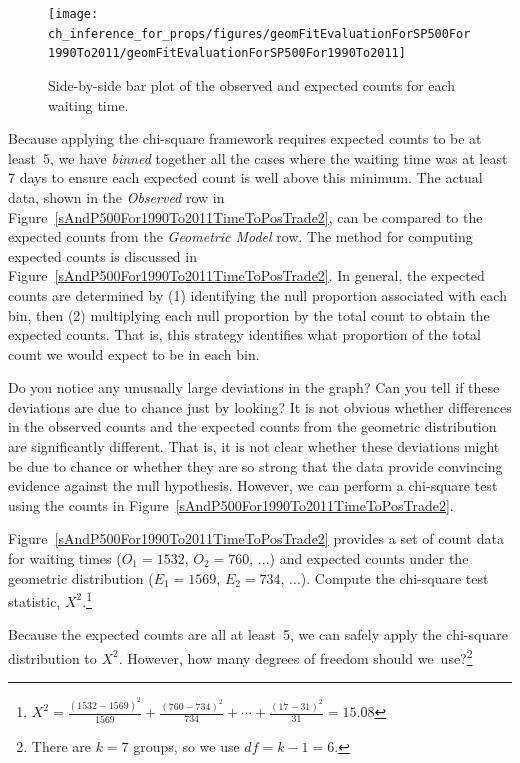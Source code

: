\begin{figure}
\centering
\texttt{[image: ch\_inference\_for\_props/figures/geomFitEvaluationForSP500For1990To2011/geomFitEvaluationForSP500For1990To2011]}
\caption{Side-by-side bar plot of the observed and expected counts for each waiting time.}
\label{geomFitEvaluationForSP500For1990To2011}
\end{figure}

Because applying the chi-square framework requires expected counts to be at least~5, we have \emph{binned} together all the cases where the waiting time was at least 7 days to ensure each expected count is well above this minimum. The actual data, shown in the \emph{Observed} row in Figure~\ref{sAndP500For1990To2011TimeToPosTrade2}, can be compared to the expected counts from the \emph{Geometric Model} row. The method for computing expected counts is discussed in Figure~\ref{sAndP500For1990To2011TimeToPosTrade2}. In general, the expected counts are determined by (1) identifying the null proportion associated with each bin, then (2) multiplying each null proportion by the total count to obtain the expected counts. That is, this strategy identifies what proportion of the total count we would expect to be in each bin.

\begin{example}{Do you notice any unusually large deviations in the graph? Can you tell if these deviations are due to chance just by looking?}
It is not obvious whether differences in the observed counts and the expected counts from the geometric distribution are significantly different. That is, it is not clear whether these deviations might be due to chance or whether they are so strong that the data provide convincing evidence against the null hypothesis. However, we can perform a chi-square test using the counts in Figure~\ref{sAndP500For1990To2011TimeToPosTrade2}.
\end{example}

\begin{exercise}
Figure~\ref{sAndP500For1990To2011TimeToPosTrade2} provides a set of count data for waiting times ($O_1=1532$, $O_2=760$, ...) and expected counts under the geometric distribution ($E_1=1569$, $E_2=734$, ...). Compute the chi-square test statistic, $X^2$.\footnote{$X^2=\frac{(1532-1569)^2}{1569} + \frac{(760-734)^2}{734} + \cdots + \frac{(17-31)^2}{31} = 15.08$}
\end{exercise}

\begin{exercise}
Because the expected counts are all at least~5, we can safely apply the chi-square distribution to $X^2$. However, how many degrees of freedom should we~use?\footnote{There are $k=7$ groups, so we use $df=k-1=6$.}
\end{exercise}

